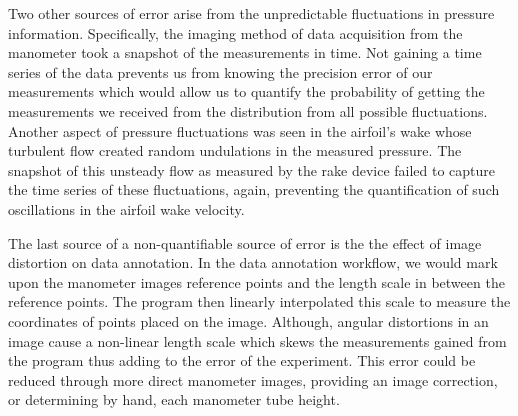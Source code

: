 \documentclass[runningheads]{llncs}
\begin{document}
\noindent
Two other sources of error arise from the unpredictable fluctuations in pressure information. Specifically, the imaging method of data acquisition from the manometer took a snapshot of the measurements in time. Not gaining a time series of the data prevents us from knowing the precision error of our measurements which would allow us to quantify the probability of getting the measurements we received from the distribution from all possible fluctuations. Another aspect of pressure fluctuations was seen in the airfoil's wake whose turbulent flow created random undulations in the measured pressure. The snapshot of this unsteady flow as measured by the rake device failed to capture the time series of these fluctuations, again, preventing the quantification of such oscillations in the airfoil wake velocity.\newline

\noindent
The last source of a non-quantifiable source of error is the the effect of image distortion on data annotation. In the data annotation workflow, we would mark upon the manometer images reference points and the length scale in between the reference points. The program then linearly interpolated this scale to measure the coordinates of points placed on the image. Although, angular distortions in an image cause a non-linear length scale which skews the measurements gained from the program thus adding to the error of the experiment. This error could be reduced through more direct manometer images, providing an image correction, or determining by hand, each manometer tube height.


\end{document}
